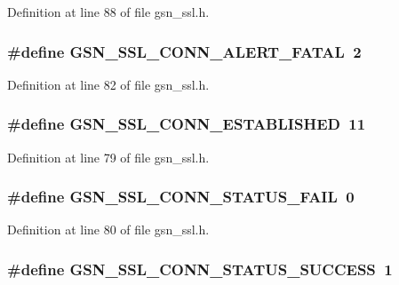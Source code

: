 Definition at line 88 of file gsn\_\-ssl.h.

\hypertarget{a00590_a52aa5f715ba7a35e30cf2ddfb349b70c}{
\subsubsection[{GSN\_\-SSL\_\-CONN\_\-ALERT\_\-FATAL}]{\setlength{\rightskip}{0pt plus 5cm}\#define GSN\_\-SSL\_\-CONN\_\-ALERT\_\-FATAL~2}}
\label{a00590_a52aa5f715ba7a35e30cf2ddfb349b70c}


Definition at line 82 of file gsn\_\-ssl.h.

\hypertarget{a00590_affb1611026ffad79cc89ecfd0b5ab126}{
\subsubsection[{GSN\_\-SSL\_\-CONN\_\-ESTABLISHED}]{\setlength{\rightskip}{0pt plus 5cm}\#define GSN\_\-SSL\_\-CONN\_\-ESTABLISHED~11}}
\label{a00590_affb1611026ffad79cc89ecfd0b5ab126}


Definition at line 79 of file gsn\_\-ssl.h.

\hypertarget{a00590_ae88c363dc4ad7b48d3d8ef525ad56ef3}{
\subsubsection[{GSN\_\-SSL\_\-CONN\_\-STATUS\_\-FAIL}]{\setlength{\rightskip}{0pt plus 5cm}\#define GSN\_\-SSL\_\-CONN\_\-STATUS\_\-FAIL~0}}
\label{a00590_ae88c363dc4ad7b48d3d8ef525ad56ef3}


Definition at line 80 of file gsn\_\-ssl.h.

\hypertarget{a00590_ad118098904d94f590753956e7ef09686}{
\subsubsection[{GSN\_\-SSL\_\-CONN\_\-STATUS\_\-SUCCESS}]{\setlength{\rightskip}{0pt plus 5cm}\#define GSN\_\-SSL\_\-CONN\_\-STATUS\_\-SUCCESS~1}}
\label{a00590_ad118098904d94f590753956e7ef09686}


